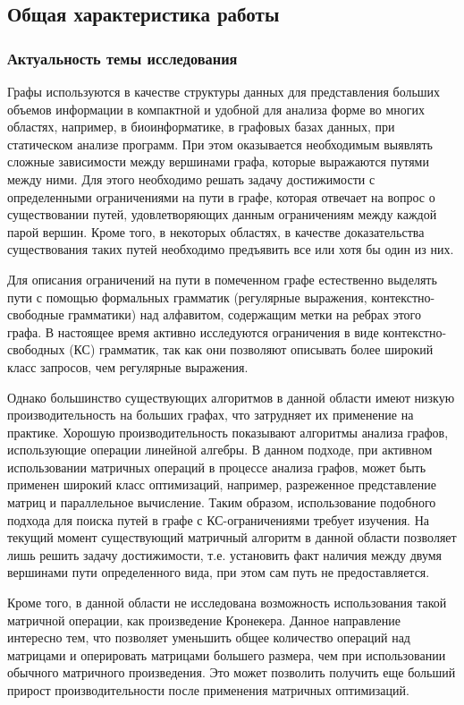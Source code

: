 \subsection*{\Large Общая характеристика работы}
\fontsize{14pt}{15pt}\selectfont
\subsubsection*{\large{Актуальность темы исследования}}
Графы используются в качестве структуры данных для представления больших объемов информации в компактной и удобной для анализа форме во многих областях, например, в биоинформатике, в графовых базах данных, при статическом анализе программ. При этом оказывается необходимым выявлять сложные зависимости между вершинами графа, которые выражаются путями между ними. Для этого необходимо решать задачу достижимости с определенными ограничениями на пути в графе, которая отвечает на вопрос о существовании путей, удовлетворяющих данным ограничениям между каждой парой вершин. Кроме того, в некоторых областях, в качестве доказательства существования таких путей необходимо предъявить все или хотя бы один из них. 


Для описания ограничений на пути в помеченном графе естественно выделять пути с помощью формальных грамматик (регулярные выражения, контекстно-свободные грамматики) над алфавитом, содержащим метки на ребрах этого графа. В настоящее время активно исследуются ограничения в виде контекстно-свободных (КС) грамматик, так как они позволяют описывать более широкий класс запросов, чем регулярные выражения.

Однако большинство существующих алгоритмов в данной области имеют низкую производительность на больших графах, что затрудняет их применение на практике. Хорошую производительность показывают алгоритмы анализа графов, использующие операции линейной алгебры. В данном подходе, при активном использовании матричных операций в процессе анализа графов, может быть применен широкий класс оптимизаций, например, разреженное представление матриц и параллельное вычисление. Таким образом, использование подобного подхода для поиска путей в графе с КС-ограничениями требует изучения. На текущий момент существующий матричный алгоритм в данной области позволяет лишь решить задачу достижимости, т.е. установить факт наличия между двумя вершинами пути определенного вида, при этом сам путь не предоставляется. 

Кроме того, в данной области не исследована возможность использования такой матричной операции, как произведение Кронекера. Данное направление интересно тем, что позволяет уменьшить общее количество операций над матрицами и оперировать матрицами большего размера, чем при использовании обычного матричного произведения. Это может позволить получить еще больший прирост производительности после применения матричных оптимизаций.

